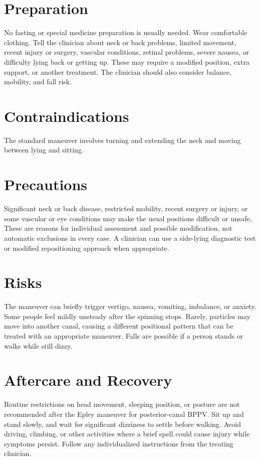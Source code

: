 \section*{Preparation}
No fasting or special medicine preparation is usually needed. Wear comfortable clothing. Tell the clinician about neck or back problems, limited movement, recent injury or surgery, vascular conditions, retinal problems, severe nausea, or difficulty lying back or getting up. These may require a modified position, extra support, or another treatment. The clinician should also consider balance, mobility, and fall risk.

\section*{Contraindications}
The standard maneuver involves turning and extending the neck and moving between lying and sitting.

\section*{Precautions}
Significant neck or back disease, restricted mobility, recent surgery or injury, or some vascular or eye conditions may make the usual positions difficult or unsafe. These are reasons for individual assessment and possible modification, not automatic exclusions in every case. A clinician can use a side-lying diagnostic test or modified repositioning approach when appropriate.

\section*{Risks}
The maneuver can briefly trigger vertigo, nausea, vomiting, imbalance, or anxiety. Some people feel mildly unsteady after the spinning stops. Rarely, particles may move into another canal, causing a different positional pattern that can be treated with an appropriate maneuver. Falls are possible if a person stands or walks while still dizzy.

\section*{Aftercare and Recovery}
Routine restrictions on head movement, sleeping position, or posture are not recommended after the Epley maneuver for posterior-canal BPPV. Sit up and stand slowly, and wait for significant dizziness to settle before walking. Avoid driving, climbing, or other activities where a brief spell could cause injury while symptoms persist. Follow any individualized instructions from the treating clinician.

